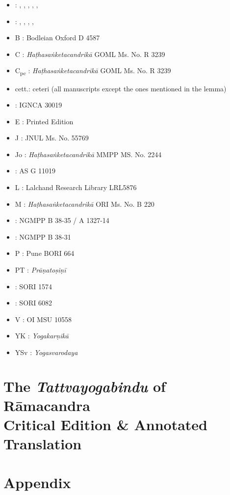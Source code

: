 \begin{itemize}
\item \beta : , , , , , 
\item \gamma : , , , , 
\item B : Bodleian Oxford D 4587
\item C : \emph{Haṭhasaṅketacandrikā} GOML Ms. No. R 3239
\item C\textsubscript{pc} : \emph{Haṭhasaṅketacandrikā} GOML Ms. No. R 3239
\item cett.: ceteri (all manuscripts except the ones mentioned in the lemma)
\item \Done : IGNCA 30019
\item E : Printed Edition
\item J : JNUL Ms. No. 55769
\item Jo : \emph{Haṭhasaṅketacandrikā} MMPP MS. No. 2244
\item \Kone : AS G 11019
\item L : Lalchand Research Library LRL5876
\item M : \emph{Haṭhasaṅketacandrikā} ORI Ms. No. B 220
\item \Ntwo : NGMPP B 38-35 / A 1327-14
\item \None : NGMPP B 38-31
\item P : Pune BORI 664
\item PT : \emph{Prāṇatoṣiṇī}
\item \Uone : SORI 1574
\item \Utwo : SORI 6082
\item V : OI MSU 10558
\item YK : \emph{Yogakarṇikā}%
\item YSv : \emph{Yogasvarodaya}
\end{itemize}
\newpage

\chapter[Critical Edition \& Annotated Translation of the \emph{Tattvayogabindu}]{The \emph{Tattvayogabindu} of Rāmacandra \\ \huge  
  Critical Edition \& Annotated Translation}
\pagestyle{chapter2style}
\cleardoublepage

\newpage
\cleardoublepage
{}
\chapter{Appendix}
